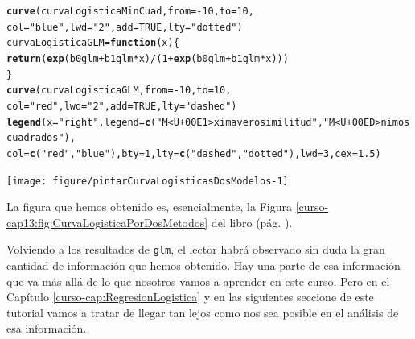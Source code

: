 \documentclass[10pt,a4paper]{article}\usepackage[]{graphicx}\usepackage[]{color}
\makeatletter
\newcommand{\hlnum}[1]{\textcolor[rgb]{0.686,0.059,0.569}{#1}}%
\newcommand{\hlstr}[1]{\textcolor[rgb]{0.192,0.494,0.8}{#1}}%
\newcommand{\hlopt}[1]{\textcolor[rgb]{0,0,0}{#1}}%
\newcommand{\hlstd}[1]{\textcolor[rgb]{0.345,0.345,0.345}{#1}}%
\newcommand{\hlkwa}[1]{\textcolor[rgb]{0.161,0.373,0.58}{\textbf{#1}}}%
\newcommand{\hlkwb}[1]{\textcolor[rgb]{0.69,0.353,0.396}{#1}}%
\newcommand{\hlkwc}[1]{\textcolor[rgb]{0.333,0.667,0.333}{#1}}%
\newcommand{\hlkwd}[1]{\textcolor[rgb]{0.737,0.353,0.396}{\textbf{#1}}}%
\newenvironment{kframe}{%
 \def\at@end@of@kframe{}%
 \ifinner\ifhmode%
  \def\at@end@of@kframe{\end{minipage}}%
  \begin{minipage}{\columnwidth}%
 \fi\fi%
 \def\FrameCommand##1{\hskip\@totalleftmargin \hskip-\fboxsep
 \colorbox{shadecolor}{##1}\hskip-\fboxsep
     \hskip-\linewidth \hskip-\@totalleftmargin \hskip\columnwidth}%
 \MakeFramed {\advance\hsize-\width
   \@totalleftmargin\z@ \linewidth\hsize
   \@setminipage}}%
 {\par\unskip\endMakeFramed%
 \at@end@of@kframe}
\newenvironment{knitrout}{}{} %
\makeatother
\begin{document}
\begin{knitrout}
\color{fgcolor}\begin{kframe}
\begin{alltt}
\hlkwd{curve}\hlstd{(curvaLogisticaMinCuad,} \hlkwc{from} \hlstd{=} \hlopt{-}\hlnum{10}\hlstd{,} \hlkwc{to} \hlstd{=} \hlnum{10}\hlstd{,}
      \hlkwc{col}\hlstd{=}\hlstr{"blue"}\hlstd{,} \hlkwc{lwd}\hlstd{=}\hlstr{"2"}\hlstd{,} \hlkwc{add}\hlstd{=}\hlnum{TRUE}\hlstd{,} \hlkwc{lty}\hlstd{=}\hlstr{"dotted"}\hlstd{)}
\hlstd{curvaLogisticaGLM} \hlkwb{=} \hlkwa{function}\hlstd{(}\hlkwc{x}\hlstd{)\{}
  \hlkwd{return}\hlstd{(}\hlkwd{exp}\hlstd{(b0glm} \hlopt{+} \hlstd{b1glm} \hlopt{*} \hlstd{x)}\hlopt{/}\hlstd{(}\hlnum{1} \hlopt{+} \hlkwd{exp}\hlstd{(b0glm} \hlopt{+} \hlstd{b1glm} \hlopt{*} \hlstd{x)))}
\hlstd{\}}
\hlkwd{curve}\hlstd{(curvaLogisticaGLM,} \hlkwc{from} \hlstd{=} \hlopt{-}\hlnum{10}\hlstd{,} \hlkwc{to} \hlstd{=} \hlnum{10}\hlstd{,}
      \hlkwc{col}\hlstd{=}\hlstr{"red"}\hlstd{,} \hlkwc{lwd}\hlstd{=}\hlstr{"2"}\hlstd{,} \hlkwc{add}\hlstd{=}\hlnum{TRUE}\hlstd{,} \hlkwc{lty}\hlstd{=}\hlstr{"dashed"}\hlstd{)}
\hlkwd{legend}\hlstd{(}\hlkwc{x}\hlstd{=}\hlstr{"right"}\hlstd{,} \hlkwc{legend}\hlstd{=}\hlkwd{c}\hlstd{(}\hlstr{"M<U+00E1>xima verosimilitud"}\hlstd{,} \hlstr{"M<U+00ED>nimos cuadrados"}\hlstd{),}
       \hlkwc{col} \hlstd{=} \hlkwd{c}\hlstd{(}\hlstr{"red"}\hlstd{,} \hlstr{"blue"}\hlstd{),} \hlkwc{bty}\hlstd{=}\hlnum{1}\hlstd{,} \hlkwc{lty}\hlstd{=}\hlkwd{c}\hlstd{(}\hlstr{"dashed"}\hlstd{,}\hlstr{"dotted"}\hlstd{),}\hlkwc{lwd}\hlstd{=}\hlnum{3}\hlstd{,}\hlkwc{cex}\hlstd{=}\hlnum{1.5}\hlstd{)}
\end{alltt}
\end{kframe}

{\centering \texttt{[image: figure/pintarCurvaLogisticasDosModelos-1]} 

}



\end{knitrout}




La figura que hemos obtenido es, esencialmente, la Figura \ref{curso-cap13:fig:CurvaLogisticaPorDosMetodos} del libro (pág. \pageref{curso-cap13:fig:CurvaLogisticaPorDosMetodos}).

Volviendo a los resultados de {\tt glm}, el lector habrá observado sin duda la gran cantidad de información que hemos obtenido. Hay una parte de esa información que va más allá de lo que nosotros vamos a aprender en este curso. Pero en el Capítulo \ref{curso-cap:RegresionLogistica} y en las siguientes seccione de este tutorial vamos a tratar de llegar tan lejos como nos sea posible en el análisis de esa información.
\end{document}
